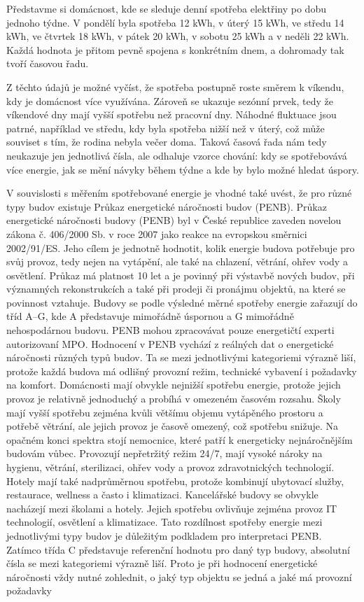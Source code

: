 Představme si domácnost, kde se sleduje denní spotřeba elektřiny po dobu jednoho týdne. V pondělí byla spotřeba 12 kWh, v úterý 15 kWh, ve středu 14 kWh, ve čtvrtek 18 kWh, v pátek 20 kWh, v sobotu 25 kWh a v neděli 22 kWh. Každá hodnota je přitom pevně spojena s konkrétním dnem, a dohromady tak tvoří časovou řadu.

Z těchto údajů je možné vyčíst, že spotřeba postupně roste směrem k víkendu, kdy je domácnost více využívána. Zároveň se ukazuje sezónní prvek, tedy že víkendové dny mají vyšší spotřebu než pracovní dny. Náhodné fluktuace jsou patrné, například ve středu, kdy byla spotřeba nižší než v úterý, což může souviset s tím, že rodina nebyla večer doma. Taková časová řada nám tedy neukazuje jen jednotlivá čísla, ale odhaluje vzorce chování: kdy se spotřebovává více energie, jak se mění návyky během týdne a kde by bylo možné hledat úspory. 

V souvislosti s měřením spotřebované energie je vhodné také uvést, že pro různé typy budov existuje Průkaz energetické náročnosti budov (PENB). Průkaz energetické náročnosti budovy (PENB) byl v České republice zaveden novelou zákona č. 406/2000 Sb. v roce 2007 jako reakce na evropskou směrnici 2002/91/ES. Jeho cílem je jednotně hodnotit, kolik energie budova potřebuje pro svůj provoz, tedy nejen na vytápění, ale také na chlazení, větrání, ohřev vody a osvětlení. Průkaz má platnost 10 let a je povinný při výstavbě nových budov, při významných rekonstrukcích a také při prodeji či pronájmu objektů, na které se povinnost vztahuje. Budovy se podle výsledné měrné spotřeby energie zařazují do tříd A–G, kde A představuje mimořádně úspornou a G mimořádně nehospodárnou budovu. PENB mohou zpracovávat pouze energetičtí experti autorizovaní MPO. Hodnocení v PENB vychází z reálných dat o energetické náročnosti různých typů budov. Ta se mezi jednotlivými kategoriemi výrazně liší, protože každá budova má odlišný provozní režim, technické vybavení i požadavky na komfort. Domácnosti mají obvykle nejnižší spotřebu energie, protože jejich provoz je relativně jednoduchý a probíhá v omezeném časovém rozsahu. Školy mají vyšší spotřebu zejména kvůli většímu objemu vytápěného prostoru a potřebě větrání, ale jejich provoz je časově omezený, což spotřebu snižuje. Na opačném konci spektra stojí nemocnice, které patří k energeticky nejnáročnějším budovám vůbec. Provozují nepřetržitý režim 24/7, mají vysoké nároky na hygienu, větrání, sterilizaci, ohřev vody a provoz zdravotnických technologií. Hotely mají také nadprůměrnou spotřebu, protože kombinují ubytovací služby, restaurace, wellness a často i klimatizaci. Kancelářské budovy se obvykle nacházejí mezi školami a hotely. Jejich spotřebu ovlivňuje zejména provoz IT technologií, osvětlení a klimatizace. Tato rozdílnost spotřeby energie mezi jednotlivými typy budov je důležitým podkladem pro interpretaci PENB. Zatímco třída C představuje referenční hodnotu pro daný typ budovy, absolutní čísla se mezi kategoriemi výrazně liší. Proto je při hodnocení energetické náročnosti vždy nutné zohlednit, o jaký typ objektu se jedná a jaké má provozní požadavky

